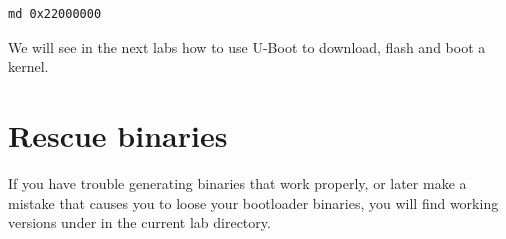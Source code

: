 \begin{verbatim}
md 0x22000000
\end{verbatim}

We will see in the next labs how to use U-Boot to download, flash and
boot a kernel.

\section{Rescue binaries}

If you have trouble generating binaries that work properly, or later
make a mistake that causes you to loose your bootloader binaries, you
will find working versions under  in the current lab
directory.
